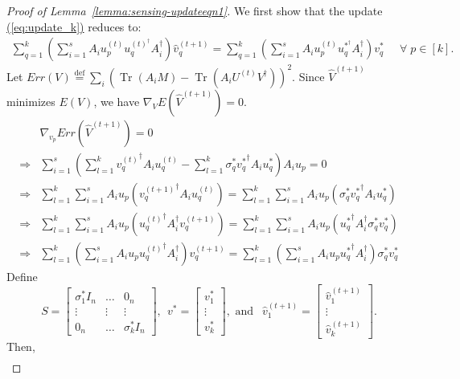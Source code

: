 \documentclass[11pt]{article}
\renewcommand{\eqref}[1]{\hyperref[#1]{(\ref*{#1})}}
\theoremstyle{plain}
\theoremstyle{definition}
\newcommand{\Tr}{\operatorname{Tr}}
\newcommand{\eqdef}{\stackrel{\textrm{def}}{=}}
\begin{document}
\begin{proof}[Proof of Lemma~\ref{lemma:sensing-updateeqn1}]
We first show that the update \eqref{eq:update_k} reduces to:
\begin{align}\label{eqn:sensing-updateeqn}
  \sum_{q=1}^k \left(\sum_{i=1}^s A_i u_p^{(t)} u_q^{(t)^\dag } A_i^\dag \right)\widehat{v}_q^{(t+1)}
	= \sum_{q=1}^k \left(\sum_{i=1}^s A_i u_p^{(t)} u_q^{*^\dag } A_i^\dag \right) v_q^* \;\;\;\;\; \forall \; p\in[k].
\end{align}
  Let $Err(V)\eqdef \sum_i \left(\Tr\left(A_i M\right) - \Tr\left(A_i U^{(t)}V^\dag \right)\right)^2$. Since $\widehat{V}^{(t+1)}$
minimizes $E(V)$, we have $\nabla_{V} E(\widehat{V}^{(t+1)})=0$.
\begin{align*}
  &\nabla_{v_p} Err(\widehat{V}^{(t+1)})=0 \\
  \Rightarrow &\sum_{i=1}^s \left(\sum_{l=1}^k {v_q^{(t)}}^\dag  A_i u_q^{(t)} - \sum_{l=1}^k \sigma_q^*{v_q^*}^\dag  A_i u_q^* \right)
	A_i u_p =0 \\
  \Rightarrow &\sum_{l=1}^k \sum_{i=1}^s A_i u_p \left({v_q^{(t+1)}}^\dag  A_i u_q^{(t)}\right)
	= \sum_{l=1}^k \sum_{i=1}^s A_i u_p \left(\sigma_q^*{v_q^*}^\dag  A_i u_q^*\right) \\
  \Rightarrow &\sum_{l=1}^k \sum_{i=1}^s A_i u_p \left({u_q^{(t)}}^\dag  A_i^\dag  v_q^{(t+1)}\right)
	= \sum_{l=1}^k \sum_{i=1}^s A_i u_p \left({u_q^*}^\dag  A_i^\dag  \sigma_q^*v_q^*\right) \\
  \Rightarrow &\sum_{l=1}^k \left(\sum_{i=1}^s A_i u_p {u_q^{(t)}}^\dag  A_i^\dag \right) v_q^{(t+1)}
	= \sum_{l=1}^k \left(\sum_{i=1}^s A_i u_p {u_q^*}^\dag  A_i^\dag \right) \sigma_q^*v_q^*
\end{align*}
Define $$S=\left[\begin{matrix}\sigma_1^*I_{n}&\dots&0_{n}\\\vdots&\vdots&\vdots\\0_n&\dots&\sigma_k^*I_n\end{matrix}\right],\ \ v^*=\left[\begin{matrix}v_1^*\\\vdots\\v_k^*\end{matrix}\right],\mbox{ and }\ \  \widehat{v}_1^{(t+1)}=\left[\begin{matrix}\widehat{v}_1^{(t+1)}\\\vdots\\\widehat{v}_k^{(t+1)}\end{matrix}\right].$$ 
Then, 
\begin{align*}

\end{align*}
\end{proof}
\end{document}
